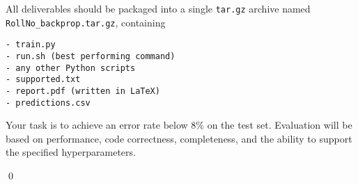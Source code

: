 All deliverables should be packaged into a single \texttt{tar.gz} archive named \texttt{RollNo\_backprop.tar.gz}, containing
\begin{verbatim}
- train.py
- run.sh (best performing command)
- any other Python scripts
- supported.txt
- report.pdf (written in LaTeX)
- predictions.csv
\end{verbatim}

Your task is to achieve an error rate below 8\% on the test set. Evaluation will be based on performance, code correctness, completeness, and the ability to support the specified hyperparameters. 

\qed

\afterpage{\blankpage}